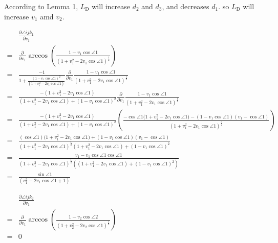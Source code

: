 According to Lemma 1, $L_\text{D}$ will increase $d_2$ and $d_3$, and decreases $d_1$.
so  $L_\text{D}$ will increase $v_1$ amd $v_2$.





\begin{equation}
  \begin{aligned}
    & \frac{\partial \angle ijk_1}{\partial v_1} \\
    = 
    & \frac{\partial }{\partial v_1}
    \arccos (\frac{1 - v_1\cos\angle1}{{(1+v_1^2-2v_1 \cos\angle1 )^\frac{1}{2}}} ) \\
  =
  & \frac{-1}{1+\frac{(1 - v_1\cos\angle1)^2}{{(1+v_1^2-2v_1 \cos\angle1 )}}}
  \frac{\partial }{\partial v_1}
  \frac{1 - v_1\cos\angle1}{{(1+v_1^2-2v_1 \cos\angle1 )^\frac{1}{2}}} \\
  =
  & \frac
  {-(1+v_1^2-2v_1 \cos\angle1 )}
  {(1+v_1^2-2v_1 \cos\angle1 )+(1 - v_1\cos\angle1)^2}
  \frac{\partial }{\partial v_1}
  \frac{1 - v_1\cos\angle1}{{(1+v_1^2-2v_1 \cos\angle1 )^\frac{1}{2}}} \\
  =
  & \frac
  {-(1+v_1^2-2v_1 \cos\angle1 )}
  {(1+v_1^2-2v_1 \cos\angle1 )+(1 - v_1\cos\angle1)^2}
\left(
    \frac
    {
      -\cos\angle1({1+v_1^2-2v_1 \cos\angle1 )} 
      -
      (1 - v_1\cos\angle1)
      (v_1-\cos\angle1)
    }
    {(1+v_1^2-2v_1 \cos\angle1)^{\frac{3}{2}}}
  \right) \\
  =
  & 
\frac
    {
      (\cos\angle1)({1+v_1^2-2v_1 \cos\angle1 )} 
      +
      (1 - v_1\cos\angle1)
      (v_1-\cos\angle1)
    }
    {
      (1+v_1^2-2v_1 \cos\angle1)^{\frac{1}{2}}
      (1+v_1^2-2v_1 \cos\angle1 )+(1 - v_1\cos\angle1)^2
    }
  \\
  =
  & 
    \frac
    {
      v_1 - v_1\cos\angle1\cos\angle1
    }
    {
      (1+v_1^2-2v_1 \cos\angle1)^{\frac{1}{2}}
      \left((1+v_1^2-2v_1 \cos\angle1 )+(1 - v_1\cos\angle1)^2\right)
    }
    \\
    =
    & 
    \frac
    { \sin{\angle{1}}}
    {
      \left(
        v_{1}^{2} - 2 v_{1} \cos{\angle{1}} + 1
      \right)
    }
  \end{aligned}
  \label{eq:ijk1_d_v1}
\end{equation}


\begin{equation}
  \begin{aligned}
    &\frac{\partial \angle ijk_2}{\partial v_1} \\
    = 
    & \frac{\partial }{\partial v_1}
    \arccos (\frac{1 - v_2\cos\angle2}{{(1+v_2^2-2v_2 \cos\angle1 )^\frac{1}{2}}} ) 
    \ \ \ \ \ \ \ \ \ \ \ \ \ \ \ \ \ \ \ \ \ \ \ \ \ \ \ \ \ \ \ \ \ \
    \ \ \ \ \ \ \ \ \ \ \ \ \ \ \ \ \ \ \ \ \ \ \ \ \ \ \ \ \ \ \ \ \ \
    \ \ \ \ \ \ \ \ \ \ \ \ \ \ \ \ \ \ \ \ \ \ \ \ \ \ \ \ \ \ \ \ \ \ \ \ \ \ \ \ \ \ \ \ \ \ \ \ \ 
    \\
  = & 0
  \end{aligned}
  \label{eq:ijk2_d_v1}
\end{equation}


